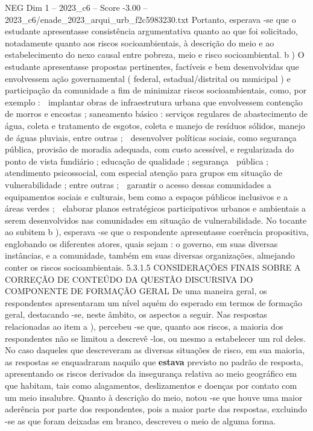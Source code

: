 \begin{textsample}{NEG Dim 1 – 2023\_c6 – Score -3.00 – 2023\_c6/enade\_2023\_arqui\_urb\_f2c5983230.txt}
Portanto, esperava -se que o estudante apresentasse consistência argumentativa quanto ao que foi solicitado, notadamente quanto aos riscos socioambientais, à descrição do meio e ao estabelecimento do nexo causal entre pobreza, meio e risco socioambiental. b ) O estudante apresentasse propostas pertinentes, factíveis e bem desenvolvidas que envolvessem ação governamental ( federal, estadual/distrital ou municipal ) e participação da comunidade a fim de minimizar riscos socioambientais, como, por exemplo :  implantar obras de infraestrutura urbana que envolvessem contenção de morros e encostas ; saneamento básico : serviços regulares de abastecimento de água, coleta e tratamento de esgotos, coleta e manejo de resíduos sólidos, manejo de águas pluviais, entre outras ;  desenvolver políticas sociais, como segurança pública, provisão de moradia adequada, com custo acessível, e regularizada do ponto de vista fundiário ; educação de qualidade ; segurança  pública ; atendimento psicossocial, com especial atenção para grupos em situação de vulnerabilidade ; entre outras ;  garantir o acesso dessas comunidades a equipamentos sociais e culturais, bem como a espaços públicos inclusivos e a áreas verdes ;  elaborar planos estratégicos participativos urbanos e ambientais a serem desenvolvidos nas comunidades em situação de vulnerabilidade.
No tocante ao subitem b ), esperava -se que o respondente apresentasse coerência propositiva, englobando os diferentes atores, quais sejam : o governo, em suas diversas instâncias, e a comunidade, também em suas diversas organizações, almejando conter os riscos socioambientais. 5.3.1.5 CONSIDERAÇÕES FINAIS SOBRE A CORREÇÃO DE CONTEÚDO DA QUESTÃO DISCURSIVA DO COMPONENTE DE FORMAÇÃO GERAL De uma maneira geral, os respondentes apresentaram um nível aquém do esperado em termos de formação geral, destacando -se, neste âmbito, os aspectos a seguir.
Nas respostas relacionadas ao item a ), percebeu -se que, quanto aos riscos, a maioria dos respondentes não se limitou a descrevê -los, ou mesmo a estabelecer um rol deles.
No caso daqueles que descreveram as diversas situações de risco, em sua maioria, as respostas se enquadraram naquilo que \textbf{estava} previsto no padrão de resposta, apresentando os riscos derivados da insegurança relativa ao meio geográfico em que habitam, tais como alagamentos, deslizamentos e doenças por contato com um meio insalubre.
Quanto à descrição do meio, notou -se que houve uma maior aderência por parte dos respondentes, pois a maior parte das respostas, excluindo -se as que foram deixadas em branco, descreveu o meio de alguma forma.

\end{textsample}
